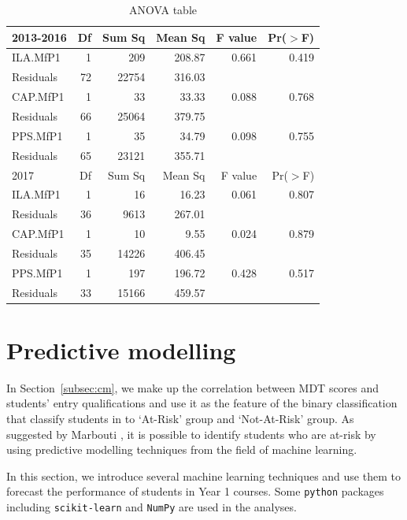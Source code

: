 \documentclass[a4paper]{report}
\begin{document}
\begin{table}[ht]
  \centering
  \begin{tabular}{lrrrrr}
    \hline
   2013-2016 & Df & Sum Sq & Mean Sq & F value & Pr($>$F) \\ 
    \hline
  ILA.MfP1 & 1 & 209 & 208.87 & 0.661 & 0.419 \\ 
    Residuals & 72 & 22754 & 316.03 &  &  \\ 
     \hline
     \hline
     CAP.MfP1 & 1 & 33 & 33.33 & 0.088 & 0.768 \\ 
       Residuals & 66 & 25064 & 379.75 &  &  \\ 
    \hline
    \hline
    PPS.MfP1 & 1 & 35 & 34.79 & 0.098 & 0.755 \\ 
    Residuals & 65 & 23121 & 355.71 &  &  \\ 
      \hline
      \hline
     2017 & Df & Sum Sq & Mean Sq & F value & Pr($>$F) \\ 
       \hline
     ILA.MfP1 & 1 & 16 & 16.23 & 0.061 & 0.807 \\ 
       Residuals & 36 & 9613 & 267.01 &  &  \\ 
    \hline
    \hline
    CAP.MfP1 & 1 & 10 & 9.55 & 0.024 & 0.879 \\ 
    Residuals & 35 & 14226 & 406.45 &  &  \\ 
    \hline
    \hline
    PPS.MfP1 & 1 & 197 & 196.72 & 0.428 & 0.517 \\ 
      Residuals & 33 & 15166 & 459.57 &  &  \\ 
      \hline
  \end{tabular}
  \caption{\label{tab:REL_splitbox_anova}ANOVA table}
\end{table}

\section{Predictive modelling}

In Section~\ref{subsec:cm}, we make up the correlation between MDT scores and students' entry qualifications and use it as the feature of the binary classification that classify students in to `At-Risk' group and `Not-At-Risk' group. As suggested by Marbouti \cite{ml}, it is possible to identify students who are at-risk by using predictive modelling techniques from the field of machine learning. 

In this section, we introduce several machine learning techniques and use them to forecast the performance of students in Year 1 courses. Some \texttt{python} packages including \texttt{scikit-learn} and \texttt{NumPy} are used in the analyses. 
\end{document}
